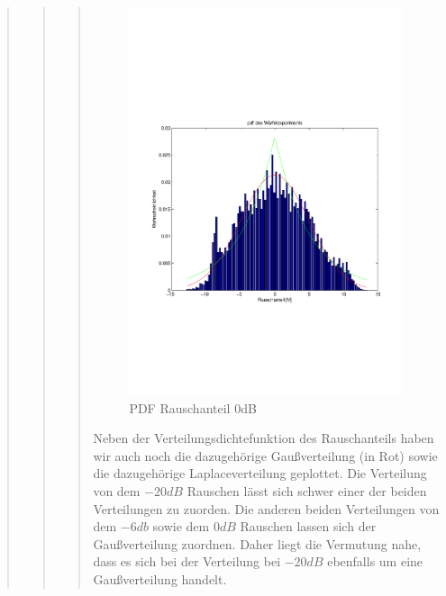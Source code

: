 \begin{quote}
\begin{quote}
\begin{quote}
        \begin{figure}[H]
        \centering
            \includegraphics[scale=0.6, trim = 1cm 6.5cm 1cm 7.5cm, clip]{./Bilder/PDFRauschen0dB}
                \caption{PDF Rauschanteil 0dB}
        \end{figure}
        
        
        Neben der Verteilungsdichtefunktion des Rauschanteils haben wir auch noch die dazugehörige Gaußverteilung (in
        Rot) sowie die dazugehörige Laplaceverteilung geplottet. Die Verteilung von dem $-20dB$ Rauschen lässt sich
        schwer einer der beiden Verteilungen zu zuorden. Die anderen beiden Verteilungen von dem $-6db$ sowie dem $0dB$
        Rauschen lassen sich der Gaußverteilung zuordnen. Daher liegt die Vermutung nahe, dass es sich bei der
        Verteilung bei $-20dB$ ebenfalls um eine Gaußverteilung handelt. \vspace{1em}
        

\end{quote}
\end{quote}
\end{quote}
